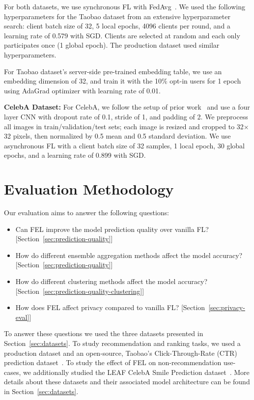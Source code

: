 For both datasets, we use synchronous FL with FedAvg~\cite{mcmahan2017learning}. We used the following hyperparameters for the Taobao dataset from an extensive hyperparameter search: client batch size of 32, 5 local epochs, 4096 clients per round, and a learning rate of 0.579 with SGD. Clients are selected at random and each only participates once (1 global epoch). The production dataset used similar hyperparameters.

For Taobao dataset's server-side pre-trained embedding table, we use an embedding dimension of 32, and train it with the 10\% opt-in users for 1 epoch using AdaGrad optimizer with learning rate of 0.01.

{\bf CelebA Dataset:}
For CelebA, we follow the setup of prior work~\cite{nguyen2021federated} and use a four layer CNN with dropout rate of 0.1, stride of 1, and padding of 2. We preprocess all images in train/validation/test sets; each image is resized and cropped to 32$\times$32 pixels, then normalized by 0.5 mean and 0.5 standard deviation. We use asynchronous FL with a client batch size of 32 samples, 1 local epoch, 30 global epochs, and a learning rate of 0.899 with SGD.

\section{Evaluation Methodology}
\label{sec:appendix-b}
Our evaluation aims to answer the following questions:

\begin{itemize}
    \item Can FEL improve the model prediction quality over vanilla FL? [Section~\ref{sec:prediction-quality}]
    \item How do different ensemble aggregation methods affect the model accuracy? [Section~\ref{sec:prediction-quality}]
    \item How do different clustering methods affect the model accuracy? [Section~\ref{sec:prediction-quality-clustering}]
    \item How does FEL affect privacy compared to vanilla FL? [Section~\ref{sec:privacy-eval}]
\end{itemize}

To answer these questions we used the three datasets presented in Section~\ref{sec:datasets}. To study recommendation and ranking tasks, we used a production dataset and an open-source, Taobao's Click-Through-Rate (CTR) prediction dataset~\cite{li2021novel}.
To study the effect of FEL on non-recommendation use-cases, we additionally studied the LEAF CelebA Smile Prediction dataset~\cite{liu2015deep}. More details about these datasets and their associated model architecture can be found in Section~\ref{sec:datasets}.


